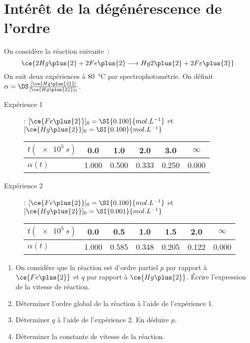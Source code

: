 \documentclass[a4paper, 12pt, final, garamond]{book}
\begin{document}
\section{Intérêt de la dégénérescence de l'ordre}
On considère la réaction suivante~:
\[\ce{2Hg\plus{2} + 2Fe\plus{2} \longrightarrow Hg2\plus{2} + 2Fe\plus{3}}\]
On suit deux expériences à \SI{80}{\degreeCelsius} par spectrophotométrie. On
définit $\alpha = \DS \frac{[\ce{Hg\plus{2}}]}{[\ce{Hg\plus{2}}]_0}$.
\begin{description}
    \item[Expérience 1] : $[\ce{Fe\plus{2}}]_0 = \SI{0.100}{mol.L^{-1}}$ et
        $[\ce{Hg\plus{2}}]_0 = \SI{0.100}{mol.L^{-1}}$
        \begin{center}
            \begin{tabular}{lccccc}
                \toprule 
                $t (\SI{e5}{s})$ &
                \num{0.0} & \num{1.0} & \num{2.0} & \num{3.0} & $\infty$\\
                \midrule
                $\alpha(t)$ &
                \num{1.000} & \num{0.500} & \num{0.333} & \num{0.250} &
                \num{0.000}\\
                \bottomrule
            \end{tabular}
        \end{center}
    \item[Expérience 2] : $[\ce{Fe\plus{2}}]_0 = \SI{0.100}{mol.L^{-1}}$ et
        $[\ce{Hg\plus{2}}]_0 = \SI{0.001}{mol.L^{-1}}$
        \begin{center}
            \begin{tabular}{lcccccc}
                \toprule 
                $t (\SI{e5}{s})$ &
                \num{0.0} & \num{0.5} & \num{1.0} & \num{1.5} & \num{2.0} &
                $\infty$\\
                \midrule
                $\alpha(t)$ &
                \num{1.000} & \num{0.585} & \num{0.348} & \num{0.205} &
                \num{0.122} & \num{0.000}\\
                \bottomrule
            \end{tabular}
        \end{center}
\end{description}
\begin{enumerate}
    \item On considère que la réaction est d'ordre partiel $p$ par rapport à
        $\ce{Fe\plus{2}}$ et $q$ par rapport à $\ce{Hg\plus{2}}$. Écrire
        l'expression de la vitesse de réaction.
    \item Déterminer l'ordre global de la réaction à l'aide de l'expérience 1.
    \item Déterminer $q$ à l'aide de l'expérience 2. En déduire $p$.
    \item Déterminer la constante de vitesse de la réaction.
\end{enumerate}
\end{document}
